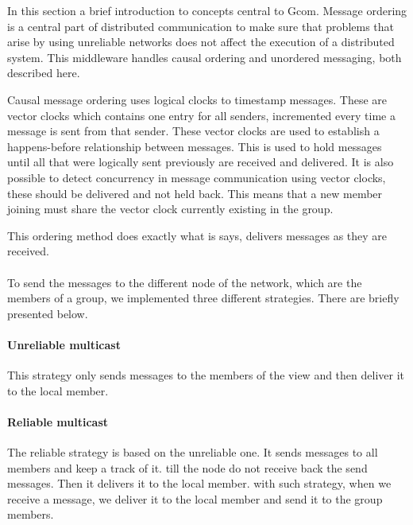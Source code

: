 In this section a brief introduction to concepts central to Gcom.
	Message ordering is a central part of distributed communication to make sure that problems that arise by using unreliable networks does not affect the execution of a distributed system.
	This middleware handles causal ordering and unordered messaging, both described here.

		Causal message ordering uses logical clocks to timestamp messages.
		These are vector clocks which contains one entry for all senders, incremented every time a message is sent from that sender.
		These vector clocks are used to establish a happens-before relationship between messages.
		This is used to hold messages until all that were logically sent previously are received and delivered.
		It is also possible to detect concurrency in message communication using vector clocks, these should be delivered and not held back.
		This means that a new member joining must share the vector clock currently existing in the group.

		This ordering method does exactly what is says, delivers messages as they are received.


\paragraph{}{
    To send the messages to the different node of the network,
 which are the members of a group, we implemented three different
 strategies. There are briefly presented below.
}

\paragraph{Unreliable multicast}{
    This strategy only sends messages to the members of the view
 and then deliver it to the local member.
 }

\paragraph{Reliable multicast}{
    The reliable strategy is based on the unreliable one. It
 sends messages to all members and keep a track of it. till
 the node do not receive back the send messages. Then it delivers
 it to the local member. with such strategy, when we receive a
 message, we deliver it to the local member and send it to the
 group members.
}

